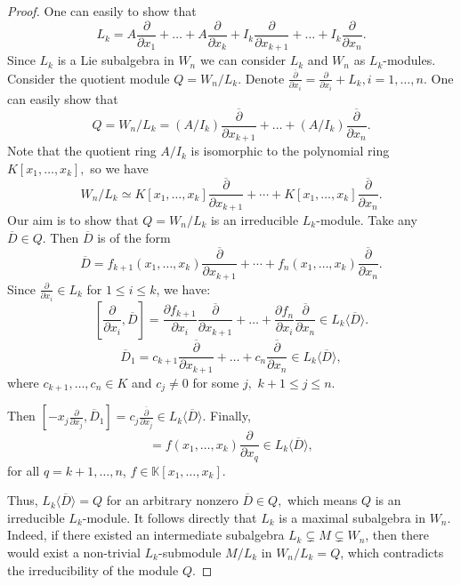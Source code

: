\documentclass[12pt,a4paper]{amsart}
\theoremstyle{plain}
\theoremstyle{definition}
\begin{document}
{	\begin{proof} One can easily to show that 
		$$L_k=A\frac{\partial}{\partial x_1} + \dots +A\frac{\partial}{\partial x_k} + I_k \frac{\partial}{\partial x_{k+1}} + \dots + I_k \frac{\partial}{\partial x_n}.
		$$
		Since $L_k$ is a Lie subalgebra in $W_n$ we can consider $L_k$  and $W_n$ as   $L_k$-modules.  
		Consider the quotient module $Q=W_n/L_k.$ Denote ${\frac{\overline{\partial}}{\partial x_i}}=\frac{\partial}{\partial x_i}+L_k, i=1, \ldots , n.$ One can easily  show that 
		$$			Q = W_n / L_k=(A/I_k){\frac{\overline{\partial}}{\partial x_{k+1}}} + \dots + (A/I_k){\frac{\overline{\partial}}{\partial x_n}}.$$
		Note that the quotient ring $A/I_k $ is isomorphic to the polynomial ring $K[x_1, \dots, x_k],$ so we have  
		$$W_n/L_k\simeq {K}[x_1, \dots, x_k]{\frac{\overline{\partial}}{\partial x_{k+1}}}+\cdots + {K}[x_1, \dots, x_k]{\frac{\overline{\partial}}{\partial x_n}}.
		$$
		Our aim is to show that $Q=W_n/L_k$ is an irreducible $L_k$-module. 
		Take any $\overline{D}\in Q.$	Then $\overline{D}$ is of the form  
		$$		
		\overline{D} = f_{k+1}(x_1, \dots, x_k){\frac{\overline{\partial}}{\partial x_{k+1}}} + \cdots + f_n(x_1, \dots, x_k){\frac{\overline{\partial}}{\partial x_n}}.
		$$	
		Since  $\frac{\partial}{\partial x_i} \in L_k$ for $1 \le i \le k$, we have:
		$$[\frac{\partial}{\partial x_i},  \overline{D}] = \frac{\partial f_{k+1}}{\partial x_i} \frac{\overline{\partial}}{\partial x_{k+1}} + \dots + \frac{\partial f_n}{\partial x_i} \frac{\overline{\partial}}{\partial x_n} \in L_k\langle \overline{D}\rangle .
		$$
		$$	\overline{D}_1 = c_{k+1}\frac{\overline{\partial}}{\partial x_{k+1}} + \dots + c_n \frac{\overline{\partial}}{\partial x_n} \in L_k\langle \overline{D}\rangle ,
		$$
		where $c_{k+1}, \dots, c_n \in K$ and $c_j \ne 0$ for some $j,$ $k+1\leq j\leq n.$
		
		Then $[-x_j \frac{\partial}{\partial x_j}, \overline{D}_1] = c_j \frac{\overline{\partial}}{\partial x_j} \in L_k \langle \overline{D} \rangle$.
		Finally, 
		\begin{equation*}
			[-x_j f(x_1, \dots, x_k) \frac{\partial}{\partial x_q}, \frac{\overline{\partial}}{\partial x_j}] = f(x_1, \dots , x_k) \frac{\partial}{\partial x_q} \in L_k \langle \overline{D} \rangle,
		\end{equation*} 
		for all $q = k+1,\dots,n$, $f \in \mathbb{K}[x_1, \dots, x_k]$.
		
		Thus, $L_k \langle \overline{D} \rangle = Q$ for an arbitrary nonzero $\overline{D} \in Q, $ which means $Q$ is an irreducible $L_k$-module.
		It follows directly that $L_k$ is a maximal subalgebra in $W_n$. 
		Indeed, if there existed an intermediate subalgebra $L_k \subsetneq M \subsetneq W_n$, then there would exist a non-trivial $L_k$-submodule $M/L_k$ in $W_n/L_k = Q$, which contradicts the irreducibility of the module $Q$.
	\end{proof}
	
}
\end{document}
